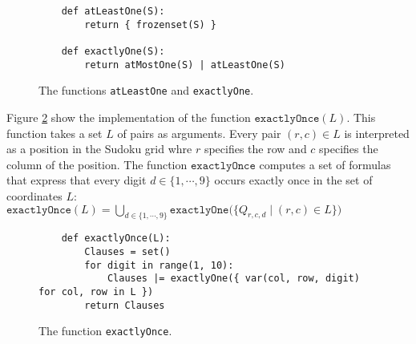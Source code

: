 \begin{figure}[!ht]
\centering
\begin{verbatim}
    def atLeastOne(S):
        return { frozenset(S) }
    
    def exactlyOne(S):
        return atMostOne(S) | atLeastOne(S)
\end{verbatim}
\vspace*{-0.3cm}
\caption{The functions \texttt{atLeastOne} and \texttt{exactlyOne}.}
\label{fig:sudoku-exactly}
\end{figure}

Figure \ref{fig:sudoku-exactlyOnce} show the implementation of the function
$\texttt{exactlyOnce}(L)$.  This function takes a set $L$ of pairs as arguments.  Every pair $(r,c) \in L$ is
interpreted as a position in the Sudoku grid whre $r$ specifies the row and $c$ specifies the column of the
position.  The function $\texttt{exactlyOnce}$ computes a set of formulas that express that every digit
$d \in \{1,\cdots,9\}$ occurs exactly once in the set of coordinates $L$: 
\\[0.2cm]
\hspace*{1.3cm}
$\texttt{exactlyOnce}(L) = \bigcup\limits_{d \in \{1,\cdots,9\}} \mathtt{exactlyOne}\bigl(\bigl\{ Q_{r,c,d} \mid (r,c) \in L \bigl\}\bigr)$


\begin{figure}[!ht]
\centering
\begin{verbatim}
    def exactlyOnce(L):
        Clauses = set()
        for digit in range(1, 10):
            Clauses |= exactlyOne({ var(col, row, digit)  for col, row in L })
        return Clauses
\end{verbatim}
\vspace*{-0.3cm}
\caption{The function \texttt{exactlyOnce}.}
\label{fig:sudoku-exactlyOnce}
\end{figure}

